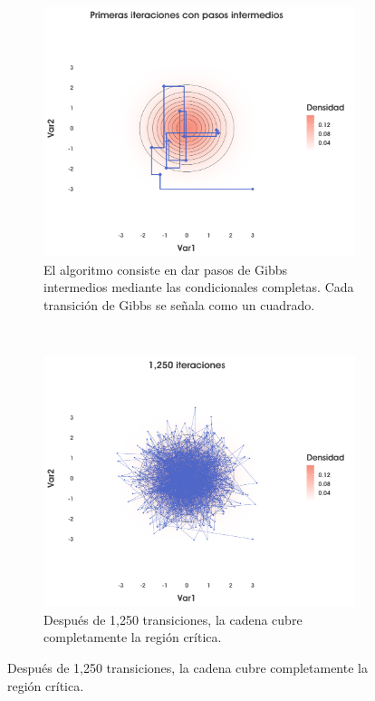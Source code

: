 \begin{figure}[h]
    \centering
    \begin{subfigure}{0.3\textwidth}
        \includegraphics[width=\textwidth]{Figs/Bayes/Ejemplo_GS_A}
        \caption{El algoritmo consiste en dar pasos de Gibbs intermedios mediante las condicionales completas. Cada transición de Gibbs se señala como un cuadrado.}
    \end{subfigure}
    ~ 
    \begin{subfigure}{0.3\textwidth}
        \includegraphics[width=\textwidth]{Figs/Bayes/Ejemplo_GS_B}
        \caption{Después de 1,250 transiciones, la cadena cubre completamente la región crítica.}

\end{subfigure}
\end{figure}
